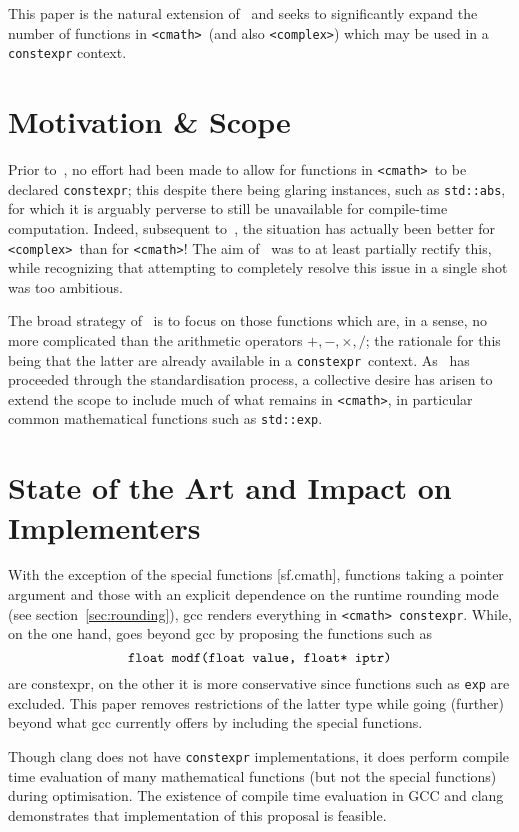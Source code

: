 \documentclass[prd,twocolumn,amsmath,amssymb,nofootinbib,eqsecnum]{revtex4-1}
\newcommand{\constexpr}{\code{constexpr}\xspace}
\newcommand{\code}[1]{{\tt #1}}
\newcommand{\header}[1]{{\tt <#1>}}
\newcommand{\cmath}{\header{cmath}}
\newcommand{\complex}{\header{complex}}
\newcommand{\Operators}{\ensuremath{+,-,\times,/}}
\begin{document}
This paper is the natural extension of~\cite{Rosten-constexpr} and seeks to significantly expand the number of functions in \cmath\ (and also \complex) which may be used in a \constexpr context. 


\section{Motivation \& Scope}

Prior to~\cite{Rosten-constexpr}, no effort had been made to allow for functions in \cmath\ to be declared \constexpr; this despite there being glaring instances, such as \code{std::abs}, for which it is arguably perverse to still be unavailable for compile-time computation. Indeed, subsequent to~\cite{AP-complex}, the situation has actually been better for \complex\ than for \cmath! The aim of~\cite{Rosten-constexpr} was to at least partially rectify this, while recognizing that attempting to completely resolve this issue in a single shot was too ambitious.

The broad strategy of~\cite{Rosten-constexpr} is to focus on those functions which are, in a sense, no more complicated than the arithmetic operators \Operators; the rationale for this being that the latter are already available in a \constexpr\ context.
As~\cite{Rosten-constexpr} has proceeded through the standardisation process, a collective desire has arisen to extend the scope to include much of what remains in \cmath, in particular common mathematical functions such as \code{std::exp}.


\section{State of the Art and Impact on Implementers}

With the exception of the special functions [sf.cmath], functions taking a pointer argument and those with an explicit dependence on the runtime rounding mode (see section~\ref{sec:rounding}), gcc renders everything in \cmath\ \constexpr. While, on the one hand, \cite{Rosten-constexpr} goes beyond gcc by proposing the functions such as
\[
	\mbox{\code{float modf(float value, float* iptr)}}
\]
are constexpr, on the other it is more conservative since functions such as \code{exp} are excluded. This paper removes restrictions of the latter type while going (further) beyond what gcc currently offers by including the special functions.

Though clang does not have \constexpr implementations, it does perform compile time evaluation of many mathematical functions (but not the special functions) during optimisation. The existence of compile time evaluation in GCC and clang demonstrates that implementation of this proposal is feasible.
\end{document}

